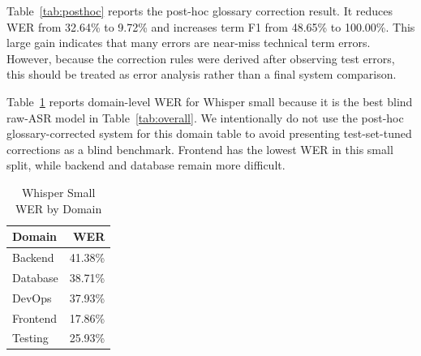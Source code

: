 \documentclass[conference]{IEEEtran}
\begin{document}
Table~\ref{tab:posthoc} reports the post-hoc glossary correction result. It reduces WER from 32.64\% to 9.72\% and increases term F1 from 48.65\% to 100.00\%. This large gain indicates that many errors are near-miss technical term errors. However, because the correction rules were derived after observing test errors, this should be treated as error analysis rather than a final system comparison.

\begin{table}[htbp]
\caption{Post-Hoc Glossary Correction Analysis}
\begin{center}
\label{tab:posthoc}
\end{center}
\end{table}

Table~\ref{tab:domain} reports domain-level WER for Whisper small because it is the best blind raw-ASR model in Table~\ref{tab:overall}. We intentionally do not use the post-hoc glossary-corrected system for this domain table to avoid presenting test-set-tuned corrections as a blind benchmark. Frontend has the lowest WER in this small split, while backend and database remain more difficult.

\begin{table}[htbp]
\caption{Whisper Small WER by Domain}
\begin{center}
\begin{tabular}{lr}
\toprule
\textbf{Domain} & \textbf{WER} \\
\midrule
Backend & 41.38\% \\
Database & 38.71\% \\
DevOps & 37.93\% \\
Frontend & 17.86\% \\
Testing & 25.93\% \\
\bottomrule
\end{tabular}
\label{tab:domain}
\end{center}
\end{table}
\end{document}
